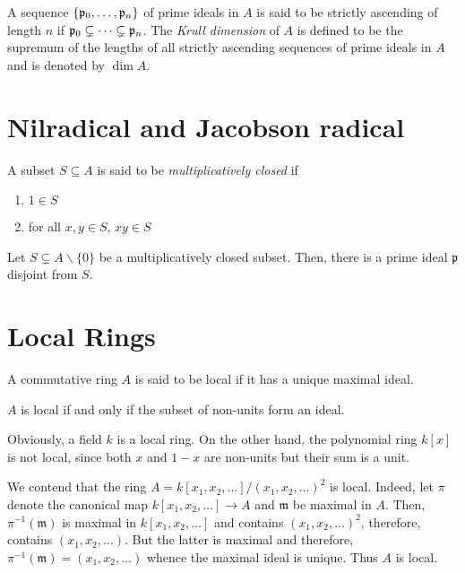 \begin{definition}
    A sequence $\{\mathfrak p_0,\ldots,\mathfrak p_n\}$ of prime ideals in $A$ is said to be strictly ascending of length $n$ if $\mathfrak p_0\subsetneq\cdots\subsetneq\mathfrak p_n$. The \textit{Krull dimension} of $A$ is defined to be the supremum of the lengths of all strictly ascending sequences of prime ideals in $A$ and is denoted by $\dim A$.
\end{definition}

\section{Nilradical and Jacobson radical}

\begin{definition}
    A subset $S\subseteq A$ is said to be \textit{multiplicatively closed} if 
    \begin{enumerate}[label=(\alph*)]
        \item $1\in S$ 
        \item for all $x,y\in S$, $xy\in S$
    \end{enumerate}
\end{definition}

\begin{proposition}
    Let $S\subsetneq A\backslash\{0\}$ be a multiplicatively closed subset. Then, there is a prime ideal $\mathfrak p$ disjoint from $S$.
\end{proposition}

\section{Local Rings}
\begin{definition}
    A commutative ring $A$ is said to be local if it has a unique maximal ideal.
\end{definition}

\begin{proposition}
    $A$ is local if and only if the subset of non-units form an ideal.
\end{proposition}

Obviously, a field $k$ is a local ring. On the other hand, the polynomial ring $k[x]$ is not local, since both $x$ and $1 - x$ are non-units but their sum is a unit. 

We contend that the ring $A = k[x_1,x_2,\ldots]/(x_1,x_2,\ldots)^2$ is local. Indeed, let $\pi$ denote the canonical map $k[x_1,x_2,\ldots]\to A$ and $\mathfrak m$ be maximal in $A$. Then, $\pi^{-1}(\mathfrak m)$ is maximal in $k[x_1,x_2,\ldots]$ and contains $(x_1,x_2,\ldots)^2$, therefore, contains $(x_1,x_2,\ldots)$. But the latter is maximal and therefore, $\pi^{-1}(\mathfrak m) = (x_1,x_2,\ldots)$ whence the maximal ideal is unique. Thus $A$ is local.



